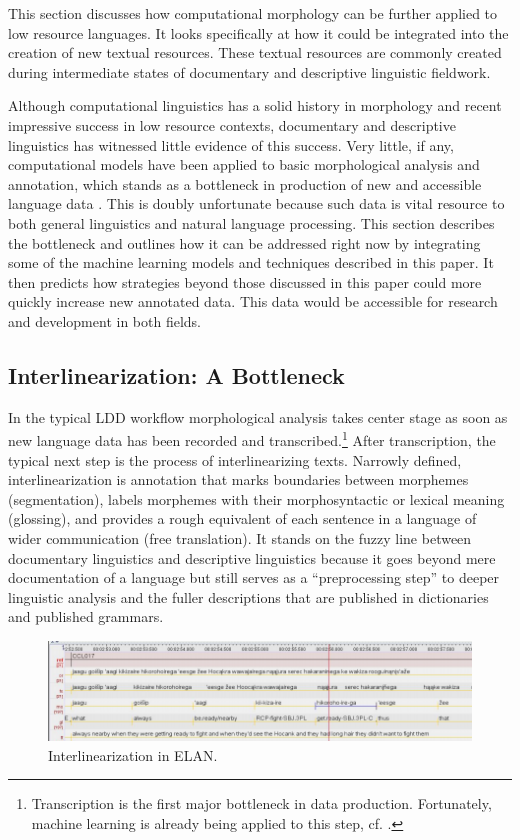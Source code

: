\documentclass[12pt]{article}
\begin{document}
This section discusses how computational morphology can be further applied to low resource languages. It looks specifically at how it could be integrated into the creation of new textual resources. These textual resources are commonly created during intermediate states of documentary and descriptive linguistic fieldwork.

Although computational linguistics has a solid history in morphology and recent impressive success in low resource contexts, documentary and descriptive linguistics has witnessed little evidence of this success. Very little, if any, computational models have been applied to basic morphological analysis and annotation, which stands as a bottleneck in production of new and accessible language data \cite{holton_developing_2017}. This is doubly unfortunate because such data is vital resource to both general linguistics and natural language processing. This section describes the bottleneck and outlines how it can be addressed right now by integrating some of the machine learning models and techniques described in this paper. It then predicts how strategies beyond those discussed in this paper could more quickly increase new annotated data. This data would be accessible for research and development in both fields.

\subsection{Interlinearization: A Bottleneck}
In the typical LDD workflow morphological analysis takes center stage as soon as new language data has been recorded and transcribed.\footnote{Transcription is the first major bottleneck in data production. Fortunately, machine learning is already being applied to this step, cf. \cite{foley_elpis_2018}.} After transcription, the typical next step is the  process of interlinearizing texts. Narrowly defined, interlinearization is annotation that marks boundaries between morphemes (segmentation), labels morphemes with their morphosyntactic or lexical meaning (glossing), and provides a rough equivalent of each sentence in a language of wider communication (free translation). It stands on the fuzzy line between documentary linguistics and descriptive linguistics because it goes beyond mere documentation of a language but still serves as a ``preprocessing step'' \cite{moon_unsupervised_2009} to deeper linguistic analysis and the fuller descriptions that are published in dictionaries and published grammars. 

\begin{figure}[ht]
\label{fig:ELAN}
\begin{center}
\includegraphics[width=0.75\columnwidth]{ELAN.png}
\caption{Interlinearization in ELAN.}
\end{center}
\end{figure}
\end{document}
